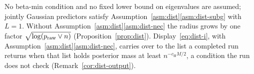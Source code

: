 
\begin{remark}\label{rem:dist-asm}
No beta-min condition and no fixed lower bound on eigenvalues are assumed; jointly Gaussian predictors satisfy
Assumption~\ref{asm:dist}\ref{asm:dist-subg} with $L=1$. Without Assumption~\ref{asm:dist}\ref{asm:dist-nec} the radius grows
by one factor $\sqrt{\log(p_{\mathrm{raw}}\vee n)}$ (Proposition~\ref{prop:dist}). Display~\eqref{eq:dist-i}, with
Assumption~\ref{asm:dist}\ref{asm:dist-nec}, carries over to the list a completed run returns when that list holds
posterior mass at least $n^{-c_{\mathrm H}M/2}$, a condition the run does not check
(Remark~\ref{cor:dist-output}).
\end{remark}
